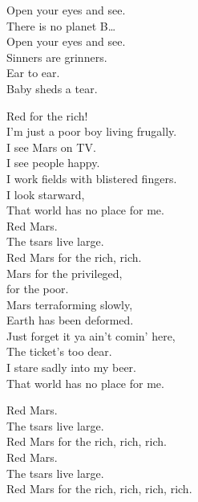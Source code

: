 Open your eyes and see. \\
There is no planet B… \\ 
Open your eyes and see. \\

Sinners are grinners. \\
Ear to ear. \\
Baby  sheds a tear. \\





Red  for the rich! \\

I'm just a poor boy living frugally. \\
I see Mars on TV. \\
I see people happy. \\
I work fields with blistered fingers. \\
I look starward, \\
That world has no place for me. \\

Red Mars. \\
The tsars live large. \\
Red Mars for the rich, rich. \\

Mars for the privileged, \\
 for the poor. \\
Mars terraforming slowly, \\
Earth has been deformed. \\
Just forget it ya ain't comin' here, \\
The ticket's too dear. \\
I stare sadly into my beer. \\
That world has no place for me.

Red Mars. \\
The tsars live large. \\
Red Mars for the rich, rich, rich. \\

Red Mars. \\
The tsars live large. \\
Red Mars for the rich, rich, rich, rich. \\

